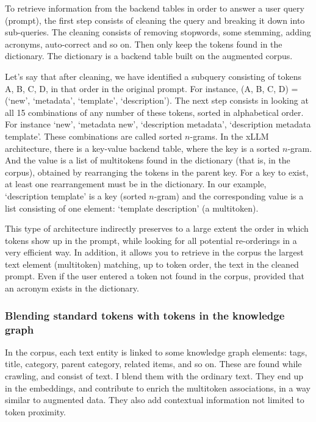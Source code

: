\documentclass[10pt]{article}
\begin{document}
{To retrieve information from the backend tables in order to answer a user query (prompt), the first step consists of cleaning the query and
 breaking it down into sub-queries. The cleaning consists of removing stopwords, some stemming, adding acronyms, auto-correct and so on. Then only keep the tokens found in the dictionary. The dictionary is a backend table built on the augmented corpus.

Let's say that after cleaning, we have identified a subquery consisting of tokens A, B, C, D, in that order in the original prompt. 
For instance, (A, B, C, D) = (`new', `metadata', `template', `description'). The next step consists in looking at all 15 combinations of any
number of these tokens, sorted in alphabetical order. For instance `new', `metadata new', `description metadata', `description metadata template'. These combinations are called \textcolor{index}{sorted $n$-grams}.
In the xLLM architecture, there is a key-value backend table, where the key is a sorted $n$-gram. And the value is a list
 of multitokens found in the dictionary (that is, in the corpus), obtained by rearranging the tokens in the parent key. For a key to exist,
 at least one rearrangement must be in the dictionary.  In our example, `description template' is a key (sorted $n$-gram) and the corresponding value is a list consisting of one element: `template description' (a multitoken).

This type of architecture indirectly preserves to a large extent the order in which tokens show up in the prompt, while looking 
 for all potential re-orderings in a very efficient way. In addition, it allows you to retrieve in the corpus the largest text element (multitoken) matching, up to token order, the text in the cleaned prompt. Even if the user entered a token not found in the corpus, provided that an acronym exists in the dictionary.   

\subsubsection{Blending standard tokens with tokens in the knowledge graph}\label{opdewbt6}

In the corpus, each text entity is linked to some knowledge graph elements: tags, title, category, parent category, related items, and so on. These are found while crawling, and consist of text. I blend them with the ordinary text. They end up in the embeddings,
 and contribute to enrich the multitoken associations, in a way similar to augmented data. They also add 
contextual information not limited to token proximity.

}
\end{document}

